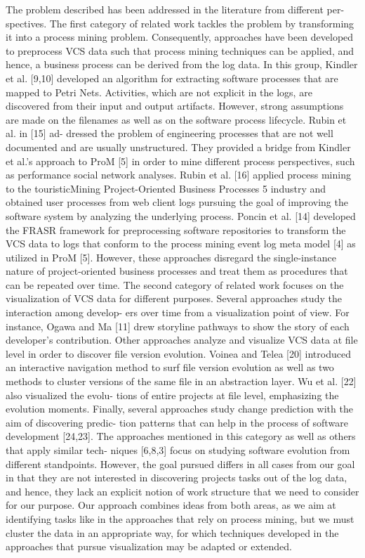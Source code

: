 The problem described has been addressed in the literature from different per-
spectives. The first category of related work tackles the problem by transforming
it into a process mining problem. Consequently, approaches have been developed
to preprocess VCS data such that process mining techniques can be applied, and
hence, a business process can be derived from the log data. In this group, Kindler
et al. [9,10] developed an algorithm for extracting software processes that are
mapped to Petri Nets. Activities, which are not explicit in the logs, are discovered
from their input and output artifacts. However, strong assumptions are made on
the filenames as well as on the software process lifecycle. Rubin et al. in [15] ad-
dressed the problem of engineering processes that are not well documented and
are usually unstructured. They provided a bridge from Kindler et al.’s approach
to ProM [5] in order to mine different process perspectives, such as performance
social network analyses. Rubin et al. [16] applied process mining to the touristicMining Project-Oriented Business Processes
5
industry and obtained user processes from web client logs pursuing the goal of
improving the software system by analyzing the underlying process. Poncin et
al. [14] developed the FRASR framework for preprocessing software repositories
to transform the VCS data to logs that conform to the process mining event log
meta model [4] as utilized in ProM [5]. However, these approaches disregard the
single-instance nature of project-oriented business processes and treat them as
procedures that can be repeated over time.
The second category of related work focuses on the visualization of VCS data
for different purposes. Several approaches study the interaction among develop-
ers over time from a visualization point of view. For instance, Ogawa and Ma
[11] drew storyline pathways to show the story of each developer’s contribution.
Other approaches analyze and visualize VCS data at file level in order to discover
file version evolution. Voinea and Telea [20] introduced an interactive navigation
method to surf file version evolution as well as two methods to cluster versions
of the same file in an abstraction layer. Wu et al. [22] also visualized the evolu-
tions of entire projects at file level, emphasizing the evolution moments. Finally,
several approaches study change prediction with the aim of discovering predic-
tion patterns that can help in the process of software development [24,23]. The
approaches mentioned in this category as well as others that apply similar tech-
niques [6,8,3] focus on studying software evolution from different standpoints.
However, the goal pursued differs in all cases from our goal in that they are not
interested in discovering projects tasks out of the log data, and hence, they lack
an explicit notion of work structure that we need to consider for our purpose.
Our approach combines ideas from both areas, as we aim at identifying tasks
like in the approaches that rely on process mining, but we must cluster the data
in an appropriate way, for which techniques developed in the approaches that
pursue visualization may be adapted or extended.